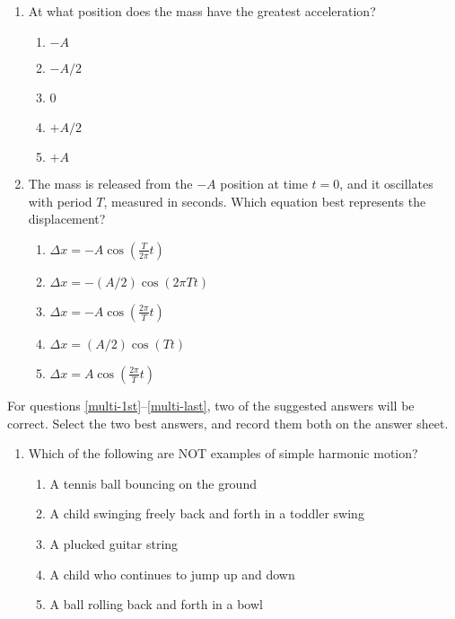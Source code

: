 \documentclass{../../../oss-apphys}
\begin{document}
\begin{multicols}{2}
\begin{enumerate}[leftmargin=18pt,resume]
  \item At what position does the mass have the greatest acceleration?
    \begin{enumerate}[noitemsep,topsep=0pt,leftmargin=18pt,label=(\Alph*)]
    \item $-A$
    \item $-A/2$
    \item 0
    \item $+A/2$
    \item $+A$
    \end{enumerate}
    
  \item The mass is released from the $-A$ position at time $t=0$, and it
    oscillates with period $T$, measured in seconds. Which equation best
    represents the displacement?
    \label{four}
    \begin{enumerate}[noitemsep,topsep=0pt,leftmargin=18pt,label=(\Alph*)]
    \item $\displaystyle \Delta x = -A\cos\left(\frac{T}{2\pi}t\right)$
    \item $\displaystyle \Delta x = -(A/2)\cos(2\pi T t)$
    \item $\displaystyle \Delta x = -A\cos\left(\frac{2\pi}{T}t\right)$
    \item $\displaystyle \Delta x = (A/2)\cos(T t)$
    \item $\displaystyle \Delta x = A\cos\left(\frac{2\pi}{T}t\right)$
    \end{enumerate}
    
   
  \end{enumerate}
  \columnbreak
  
  For questions \ref{multi-1st}--\ref{multi-last}, two of the suggested answers
  will be correct. Select the two best answers, and record them both on the
  answer sheet.
  \begin{enumerate}[leftmargin=18pt,resume]
  \item Which of the following are NOT examples of simple harmonic motion?
    \label{multi-1st}
    \begin{enumerate}[noitemsep,topsep=0pt,leftmargin=18pt,label=(\Alph*)]
    \item A tennis ball bouncing on the ground
    \item A child swinging freely back and forth in a toddler swing
    \item A plucked guitar string
    \item A child who continues to jump up and down
    \item A ball rolling back and forth in a bowl
    \end{enumerate}


\end{enumerate}
\end{multicols}
\end{document}
